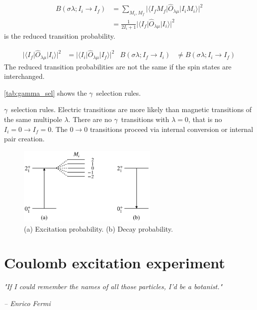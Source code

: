 \documentclass[twoside,english]{uiofysmaster/uiofysmaster}
\newcommand{\ga}{$\gamma$}
\let\orgautoref\autoref
\renewcommand{\autoref}
        {%
		 \def\sectionautorefname{Section}%
		 \def\subsectionautorefname{Section}%
		 \def\subsubsectionautorefname{Section}%
		 \def\chapterautorefname{Chapter}%
          \orgautoref}
\begin{document}
\begin{align}
	B(\sigma \lambda; I_i \rightarrow I_f) &= \sum_{M_i, M_f} | \langle I_f M_f | \hat{O}_{\lambda \mu} | I_i M_i \rangle |^2  \nonumber \\
	&= \frac{1}{2I_i + 1} | \langle I_f | \hat{O}_{\lambda \mu} | I_i \rangle |^2
\end{align}
is the reduced transition probability.

\begin{align}
	| \langle I_f | \hat{O}_{\lambda \mu} | I_i \rangle |^2 &= | \langle I_i | \hat{O}_{\lambda \mu} | I_f \rangle |^2 &  B(\sigma \lambda; I_f \rightarrow I_i) &\neq B(\sigma \lambda; I_i \rightarrow I_f)
\end{align}
The reduced transition probabilities are not the same if the spin states are interchanged. 


\autoref{tab:gamma_sel} shows the \ga\ selection rules.

\begin{table}[htb] 
    \centering 
    \caption{\ga\ selection rules. Electric transitions are more likely than magnetic transitions of the same multipole $\lambda$. There are no \ga\ transitions with $\lambda = 0$, that is no $I_i = 0 \rightarrow I_f = 0$. The $0 \rightarrow 0$ transitions proceed via internal conversion or internal pair creation.}
	
	\label{tab:gamma_sel}
\end{table}


\begin{figure}[htb]
	\centering
	\includegraphics[width=0.6\textwidth]{Images/transitions.png}
	\caption{(a) Excitation probability. (b) Decay probability.}
	\label{fig:transitions}
\end{figure}



\chapter{Coulomb excitation experiment}
\epigraph{\textit{"If I could remember the names of all those particles, I'd be a botanist."}}{\textit{– Enrico Fermi}}
\end{document}
